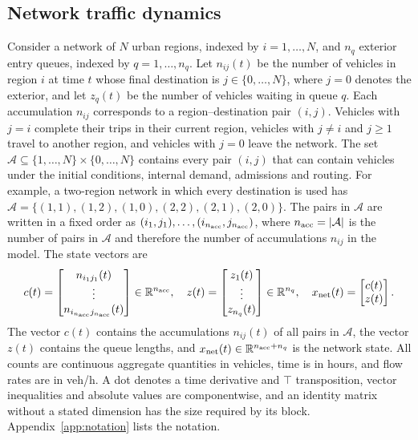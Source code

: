 \documentclass[final]{cas-sc}
\theoremstyle{definition}
\theoremstyle{plain}
\theoremstyle{definition}
\theoremstyle{plain}
\newcommand{\R}{\mathbb{R}}
\newcommand{\appref}[1]{Appendix~\ref{#1}}
\begin{document}
\subsection{Network traffic dynamics}
\label{app:new-model}

Consider a network of $N$ urban regions, indexed by $i=1,\ldots,N$, and
$n_q$ exterior entry queues, indexed by $q=1,\ldots,n_q$. Let $n_{ij}(t)$
be the number of vehicles in region $i$ at time $t$ whose final
destination is $j\in\{0,\ldots,N\}$, where $j=0$ denotes the exterior,
and let $z_q(t)$ be the number of vehicles waiting in queue $q$. Each
accumulation $n_{ij}$ corresponds to a region--destination pair $(i,j)$.
Vehicles with $j=i$ complete their trips in their current region,
vehicles with $j\ne i$ and $j\ge1$ travel to another region, and
vehicles with $j=0$ leave the network. The set
$\mathcal A\subseteq\{1,\ldots,N\}\times\{0,\ldots,N\}$ contains every
pair $(i,j)$ that can contain vehicles under the initial conditions,
internal demand, admissions and routing. For example, a two-region
network in which every destination is used has
$\mathcal A=\{(1,1),(1,2),(1,0),(2,2),(2,1),(2,0)\}$. The pairs in
$\mathcal A$ are written in a fixed order as
$(i_1,j_1),\ldots,(i_{n_{\rm acc}},j_{n_{\rm acc}})$, where
$n_{\rm acc}=|\mathcal A|$ is the number of pairs in $\mathcal A$ and
therefore the number of accumulations $n_{ij}$ in the model. The state
vectors are
\[
c(t)=\begin{bmatrix}
n_{i_1j_1}(t)\\ \vdots\\ n_{i_{n_{\rm acc}}j_{n_{\rm acc}}}(t)
\end{bmatrix}\in\R^{n_{\rm acc}},
\quad
z(t)=\begin{bmatrix}z_1(t)\\ \vdots\\z_{n_q}(t)\end{bmatrix}\in\R^{n_q},
\quad
x_{\rm net}(t)=\begin{bmatrix}c(t)\\z(t)\end{bmatrix}.
\]
The vector $c(t)$ contains the accumulations $n_{ij}(t)$ of all pairs
in $\mathcal A$, the vector $z(t)$ contains the queue lengths, and
$x_{\rm net}(t)\in\R^{n_{\rm acc}+n_q}$ is the network state. All counts are continuous aggregate quantities in
vehicles, time is in hours, and flow rates are in veh/h. A dot denotes
a time derivative and $\top$ transposition, vector inequalities and
absolute values are componentwise, and an identity matrix without a
stated dimension has the size required by its block.
\appref{app:notation} lists the notation.
\end{document}

